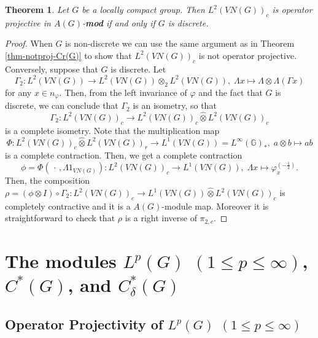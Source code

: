 \documentclass[10pt]{amsart}
\newtheorem{thm}{Theorem}
\numberwithin{thm}{section}
\numberwithin{equation}{section}
\begin{document}
	\begin{thm}\label{thm-L2column}
	Let $G$ be a locally compact group. Then $L^2(VN(G))_c$ is operator projective in $A(G)$-{\bf mod}
	if and only if $G$ is discrete.
	\end{thm}
\begin{proof}
When $G$ is non-discrete we can use the same argument as in Theorem \ref{thm-notproj-Cr(G)} to show that $L^2(VN(G))_c$ is not operator projective.
Conversely, suppose that $G$ is discrete. Let
	$$\Gamma_2 : L^2(VN(G)) \rightarrow L^2(VN(G)) \otimes_2 L^2(VN(G)),\; \Lambda x \mapsto \Lambda \otimes \Lambda (\Gamma x)$$
for any $x \in n_\varphi.$ Then, from the left invariance of $\varphi$ and the fact that $G$ is discrete,
we can conclude that $\Gamma_2$ is an isometry, so that
	$$\Gamma_2 : L^2(VN(G))_c \rightarrow L^2(VN(G))_c {\widehat{\otimes}} L^2(VN(G))_c$$ is a complete isometry.
Note that the multiplication map
	$$\Phi : L^2(VN(G))_c {\widehat{\otimes}} L^2(VN(G))_r \rightarrow L^1(VN(G)) = L^\infty({\mathbb{G}})_*, \; a\otimes b \mapsto ab$$
is a complete contraction. Then, we get a complete contraction
	$$\phi = \Phi(\,\cdot\, , \Lambda 1_{VN(G)}) : L^2(VN(G))_c \rightarrow L^1(VN(G)), \; \Lambda x \mapsto \varphi^{(-\frac{1}{2})}_x.$$
Then, the composition $\rho = (\phi \otimes I)\circ \Gamma_2 : L^2(VN(G))_c \rightarrow L^1(VN(G)) {\widehat{\otimes}} L^2(VN(G))_c$
is completely contractive and it is a $A(G)$-module map. Moreover it is straightforward to check that $\rho$ is a right inverse of $\pi_{2,c}$.
\end{proof}

\section{The modules $L^p(G)$ $(1\le p \le \infty)$, $C^*(G)$, and $C^*_{\delta}(G)$}

\subsection{Operator Projectivity of $L^p(G)$ $(1\le p \le \infty)$}
\end{document}
